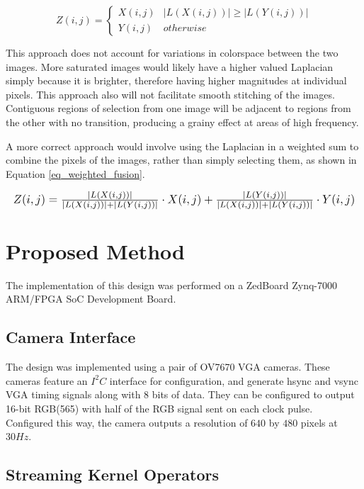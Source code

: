 \documentclass[sigconf]{acmart}
\begin{document}
\begin{equation}
Z(i,j)=
\begin{cases}
X(i,j) & |L(X(i,j))| \ge |L(Y(i,j))| \\
Y(i,j) & otherwise
\end{cases}
\label{eq_naive_fusion}
\end{equation}

This approach does not account for variations in colorspace between the two images. More saturated images would likely have a higher valued Laplacian simply because it is brighter, therefore having higher magnitudes at individual pixels. This approach also will not facilitate smooth stitching of the images. Contiguous regions of selection from one image will be adjacent to regions from the other with no transition, producing a grainy effect at areas of high frequency.

A more correct approach would involve using the Laplacian in a weighted sum to combine the pixels of the images, rather than simply selecting them, as shown in Equation \ref{eq_weighted_fusion}.

\begin{equation}
\resizebox{\columnwidth}{!} {$
	Z(i,j) = \frac{|L(X(i,j))|}{|L(X(i,j))| + |L(Y(i,j))|} \cdot X(i,j) + \frac{|L(Y(i,j))|}{|L(X(i,j))| + |L(Y(i,j))|} \cdot Y(i,j)
	\label{eq_weighted_fusion}
	$}
\end{equation}

\section{Proposed Method}

The implementation of this design was performed on a ZedBoard Zynq-7000 ARM/FPGA SoC Development Board.

\subsection{Camera Interface}

The design was implemented using a pair of OV7670 VGA cameras. These cameras feature an $I^2C$ interface for configuration, and generate hsync and vsync VGA timing signals along with 8 bits of data. They can be configured to output 16-bit RGB(565) with half of the RGB signal sent on each clock pulse. Configured this way, the camera outputs a resolution of $640$ by $480$ pixels at $30Hz$. 

\subsection{Streaming Kernel Operators}
\end{document}
